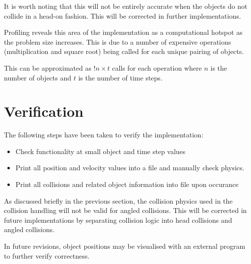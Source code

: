 \documentclass[twoside,twocolumn]{article}
\begin{document}
	It is worth noting that this will not be entirely accurate when the objects do not collide in a head-on fashion. This will be corrected in further implementations.\newline  
	
	Profiling reveals this area of the implementation as a  computational hotspot as the problem size increases. This is due to a number of expensive operations (multiplication and square root) being called for each unique pairing of objects.\newline
	
	This can be approximated as $!n \times t$ calls for each operation where $n$ is the number of objects and $t$ is the number of time steps.  \newline
	
	
	\section{Verification}
	
	The following steps have been taken to verify the implementation:
	
	\begin{itemize}
		\item Check functionality at small object and time step values
		\item Print all position and velocity values into a file and manually check physics.
		\item Print all collisions and related object information into file upon occurance
	\end{itemize}

	As discussed briefly in the previous section, the collision physics used in the collision handling will not be valid for angled collisions. This will be corrected in future implementations by separating collision logic into head collisions and angled collisions.\newline
	
	In future revisions, object positions may be visualised with an external program to further verify correctness.
		
	
\end{document}
